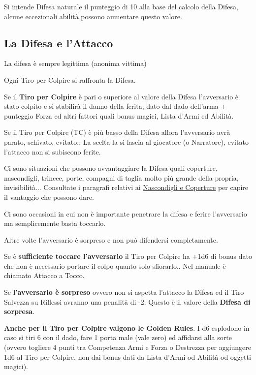 \begin{multicols}{2}
Si intende Difesa naturale il punteggio di 10 alla base del calcolo della Difesa, alcune eccezionali abilità possono aumentare questo valore.

\subsection{La Difesa e l'Attacco}\label{difesaeattacco}

\begin{enfasi}{La difesa è sempre legittima (anonima vittima)}\end{enfasi}

Ogni Tiro per Colpire si raffronta la Difesa.

Se il \textbf{Tiro per Colpire} è pari o superiore al valore della Difesa l'avversario è stato colpito e si stabilirà il danno della ferita, dato dal dado dell'arma + punteggio Forza ed altri fattori quali bonus magici, Lista d'Armi ed Abilità.

Se il Tiro per Colpire (TC) è più basso della Difesa allora l'avversario avrà parato, schivato, evitato.. La scelta la si lascia al giocatore (o Narratore), evitato l'attacco non si subiscono ferite.

Ci sono situazioni che possono avvantaggiare la Difesa quali coperture, nascondigli, trincee, porte, compagni di taglia molto più grande della propria, invisibilità... Consultate i paragrafi relativi ai \hyperlink{copertura}{Nascondigli e Coperture} per capire il vantaggio che possono dare.

Ci sono occasioni in cui non è importante penetrare la difesa e ferire l'avversario ma semplicemente basta toccarlo.

Altre volte l'avversario è sorpreso e non può difendersi completamente.

Se è \textbf{sufficiente toccare l'avversario} il Tiro per Colpire ha +1d6 di bonus dato che non è necessario portare il colpo quanto solo sfiorarlo.. Nel manuale è chiamato Attacco a Tocco.\label{attaccoatocco}\hypertarget{attaccoatocco}{}\label{difesaatocco}

Se \textbf{l'avversario è sorpreso} ovvero non si aspetta l'attacco la Difesa ed il Tiro Salvezza su Riflessi avranno una penalità di -2. Questo è il valore della \textbf{Difesa di sorpresa}.\label{difesasorpresi}

\textbf{Anche per il Tiro per Colpire valgono le Golden Rules}. I d6 esplodono in caso si tiri 6 con il dado, fare 1 porta male (vale zero) ed affidarsi alla sorte (ovvero togliere 4 punti tra Competenza Armi e Forza o Destrezza per aggiungere 1d6 al Tiro per Colpire, non dai bonus dati da Lista d'Armi od Abilità od oggetti magici).


\end{multicols}
